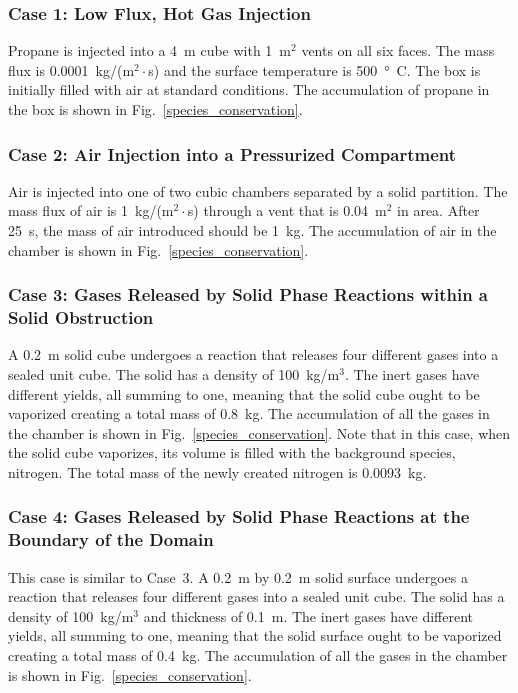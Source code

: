 \documentclass[11pt]{book}
\begin{document}
\subsubsection{Case 1: Low Flux, Hot Gas Injection}

Propane is injected into a 4~m cube with 1~m$^2$ vents on all six faces.  The mass flux is 0.0001~kg/(m$^2\cdot$s) and the surface temperature is 500~\si{\degree C}.  The box is initially filled with air at standard conditions.  The accumulation of propane in the box is shown in Fig.~\ref{species_conservation}.

\subsubsection{Case 2: Air Injection into a Pressurized Compartment}

Air is injected into one of two cubic chambers separated by a solid partition.  The mass flux of air is 1~kg/(m$^2\cdot$s) through a vent that is 0.04~m$^2$ in area. After 25~s, the mass of air introduced should be 1~kg. The accumulation of air in the chamber is shown in Fig.~\ref{species_conservation}.

\subsubsection{Case 3: Gases Released by Solid Phase Reactions within a Solid Obstruction}

A 0.2~m solid cube undergoes a reaction that releases four different gases into a sealed unit cube. The solid has a density of 100~kg/m$^3$. The inert gases have different yields, all summing to one, meaning that the solid cube ought to be vaporized creating a total mass of 0.8~kg. The accumulation of all the gases in the chamber is shown in Fig.~\ref{species_conservation}. Note that in this case, when the solid cube vaporizes, its volume is filled with the background species, nitrogen. The total mass of the newly created nitrogen is 0.0093~kg.

\subsubsection{Case 4: Gases Released by Solid Phase Reactions at the Boundary of the Domain}

This case is similar to Case~3. A 0.2~m by 0.2~m solid surface undergoes a reaction that releases four different gases into a sealed unit cube. The solid has a density of 100~kg/m$^3$ and thickness of 0.1~m. The inert gases have different yields, all summing to one, meaning that the solid surface ought to be vaporized creating a total mass of 0.4~kg. The accumulation of all the gases in the chamber is shown in Fig.~\ref{species_conservation}.
\end{document}
